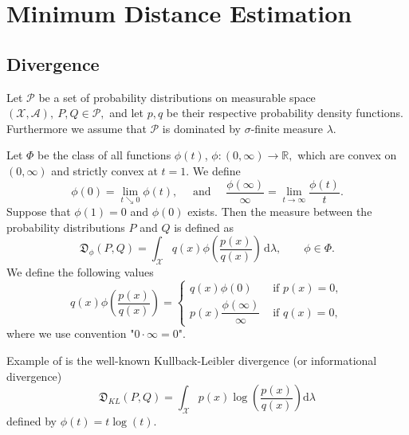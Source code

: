 \chapter{Minimum Distance  Estimation}\label{ch:MDE}
\section{\ren Divergence}
Let $\mathcal{P}$ be a set of probability distributions on measurable space $(\mathcal{X, A}), \: P,Q \in \mathcal{P},$ and let $p,q$ be their respective probability density functions. Furthermore we assume that $\mathcal{P}$ is dominated by $\sigma$-finite measure $\lambda$.

%
%


\begin{definition}
Let $\Phi$ be the class of all functions  $\phi(t)$, $\phi : (0,\infty) \rightarrow \mathbb{R},$ which are convex on $(0,\infty)$ and strictly convex at $t = 1$.  We define 
\begin{equation}
\phi(0) = \lim_{t \searrow 0} \phi(t), \quad \text{ and } \quad \frac{\phi(\infty)}{\infty} = \lim_{t\rightarrow \infty} \frac{\phi(t)}{t}.
\end{equation}
Suppose that $\phi(1) = 0$ and $\phi(0)$ exists. Then the {\em \phidiv} measure between the probability distributions $P$ and $Q$ is defined as 
\begin{equation}
\mathfrak{D}_\phi(P,Q) = \int_\mathcal{X} q(x) \phi \left( \frac{p(x)}{q(x)}\right) \,\mathrm{d}\lambda , \qquad \phi \in \Phi.
\label{eq:phiDiv}
\end{equation}
We define the following values
\begin{equation}
q(x) \phi\left( \frac{p(x)}{q(x)}\right) = 
\begin{cases}
q(x)\phi(0) & \text{ if } p(x) = 0,  \\
p(x) \dfrac{\phi(\infty)}{\infty} & \text{ if } q(x) = 0,
\end{cases}
\end{equation}
where we use convention "$0\cdot\infty = 0$".


\label{def:phiDiv}
\end{definition}
\noindent Example of \phidiv is the well-known  Kullback-Leibler divergence (or informational divergence) 
\begin{equation}
\mathfrak{D}_{KL}(P,Q) =  \int_\mathcal{X} p(x)\log\left( \frac{p(x)}{q(x)}\right) \mathrm{d}\lambda
\end{equation}
defined by $\phi(t) = t\log(t)$.

